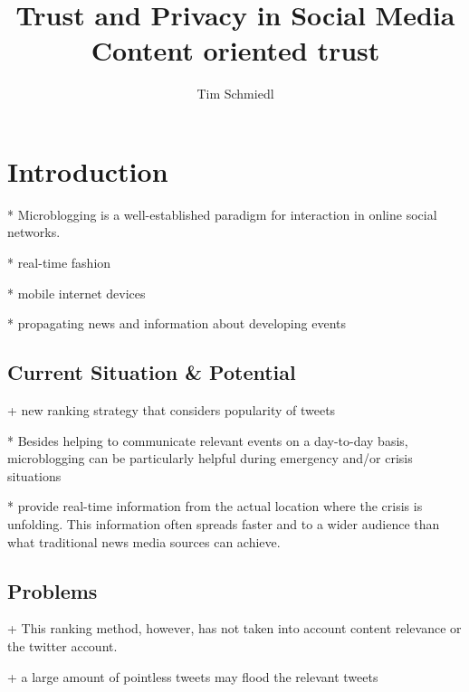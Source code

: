 \documentclass{proseminar}
\begin{document}

\title{Trust and Privacy in Social Media \\
\huge Content oriented trust}

\author{
Tim Schmiedl\\
}

\maketitle

\section{Introduction}
* Microblogging is a well-established paradigm for interaction in online social networks. 

* real-time fashion 

* mobile internet devices 

* propagating news and information about developing events 


\subsection*{Current Situation \& Potential}
+ new ranking strategy that considers popularity of tweets

* Besides helping to communicate relevant events on a day-to-day basis, microblogging can be particularly helpful during emergency and/or crisis
situations 

* provide real-time information from the actual location where the crisis is unfolding. This
information often spreads faster and to a wider audience than what traditional news
media sources can achieve.


\subsection*{Problems}
+ This ranking method, however, has not taken into account content relevance or the twitter account.

+ a large amount of pointless tweets may flood the relevant tweets
\end{document}
